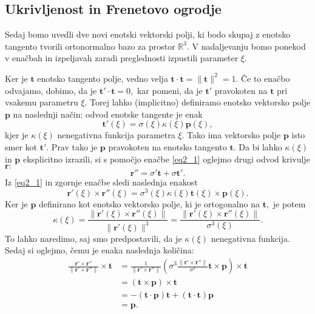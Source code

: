 \documentclass[12pt,a4paper,twoside]{article}
\theoremstyle{definition} %
\theoremstyle{plain} %
\numberwithin{equation}{section}  %
\newcommand{\R}{\mathbb R}
\newcommand{\tV}{\mathbf{t}}
\newcommand{\pV}{\mathbf{p}}
\newcommand{\rV}{\mathbf{r}}
\begin{document}
\subsection{Ukrivljenost in Frenetovo ogrodje}

Sedaj bomo uvedli dve novi enotski vektorski polji, ki bodo skupaj z enotsko tangento tvorili ortonormalno bazo za prostor $\R^3.$ V nadaljevanju bomo ponekod v enačbah in izpeljavah zaradi preglednosti izpustili parameter $\xi.$

Ker je $\tV$ enotsko tangento polje, vedno velja $\tV \cdot \tV=\lVert \tV \rVert^2 =1.$ Če to enačbo odvajamo, dobimo, da je $\mathbf{t'} \cdot \tV=0,$ kar pomeni, da je $\mathbf{t'}$ pravokoten na $\tV$ pri vsakemu parametru $\xi.$ Torej lahko (implicitno) definiramo enotsko vektorsko polje $\pV$ na naslednji način: odvod enotske tangente je enak
\begin{equation}
	\label{eq2_5}
	\mathbf{t'}(\xi)=\sigma(\xi)\kappa(\xi)\pV(\xi),
\end{equation}
kjer je $\kappa(\xi)$ nenegativna funkcija parametra $\xi.$ Tako ima vektorsko polje $\pV$ isto smer kot $\mathbf{t'}.$ Prav tako je $\pV$ pravokoten na enotsko tangento $\tV.$ Da bi lahko $\kappa(\xi)$ in $\pV$ eksplicitno izrazili, si s pomočjo enačbe \eqref{eq2_1} oglejmo drugi odvod krivulje $\rV:$
\begin{equation}
	\label{eq2_6}
	\rV''=\sigma'\tV+\sigma\mathbf{t'}.
\end{equation}
Iz \eqref{eq2_1} in zgornje enačbe sledi naslednja enakost
\begin{equation}
	\label{eq2_7}
	\rV'(\xi) \times \rV''(\xi)=\sigma^3(\xi)\kappa(\xi)\tV(\xi) \times \pV(\xi).
\end{equation}
Ker je $\pV$ definirano kot enotsko vektorsko polje, ki je ortogonalno na $\tV,$ je potem
\begin{equation}
	\label{kappa1}
	\kappa(\xi)=\frac{\lVert \rV'(\xi) \times \rV''(\xi) \rVert}{\lVert \rV'(\xi) \rVert^3}=\frac{\lVert \rV'(\xi) \times \rV''(\xi) \rVert}{\sigma^3(\xi)}.
\end{equation}
To lahko naredimo, saj smo predpostavili, da je $\kappa(\xi)$ nenegativna funkcija. Sedaj si oglejmo, čemu je enaka naslednja količina:
\begin{align}
	\frac{\rV'\times \rV''}{\lVert \rV'\times \rV'' \rVert} \times \tV &= \frac{1}{\lVert \rV'\times \rV'' \rVert} \left ( \sigma^3 \frac{\lVert \rV'\times \rV'' \rVert}{\sigma^3}\tV \times \pV\right ) \times \tV \nonumber \\
	&= (\tV \times \pV) \times \tV \nonumber \\
	&= -(\tV \cdot \pV)\tV + (\tV \cdot \tV)\pV \nonumber \\
	&= \pV. \label{normala}
\end{align}
\end{document}
